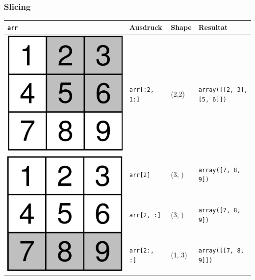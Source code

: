 \subsubsection{Slicing}
\begin{tabular}{|l|l|l|l|}
	\hline
	\texttt{arr} &Ausdruck &Shape &Resultat\\
	\hline
	\includegraphics[width=0.1\linewidth]{images/v8_numpy2} &\texttt{arr[:2, 1:]} &(2,2) &\texttt{array([[2, 3], [5, 6]])}\\
	\hline
	\multirow{3}{0.1\linewidth}{\includegraphics[width=\linewidth]{images/v8_numpy3}} &\texttt{arr[2]} &(3, ) &\texttt{array([7, 8, 9])}\\
	&\texttt{arr[2, :]} &(3, ) &\texttt{array([7, 8, 9])}\\
	&\texttt{arr[2:, :]} &(1, 3) &\texttt{array([[7, 8, 9]])}\\
	\hline

\end{tabular}
